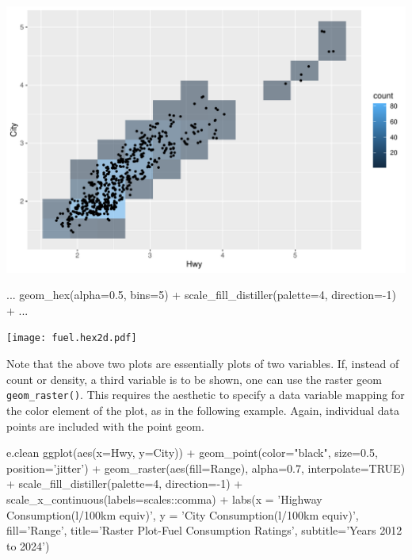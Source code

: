 \begin{center}
  \includegraphics[width=.8\textwidth]{fuel.bin2d.pdf}
\end{center}

\begin{samepage}
\begin{Rcode}
...
    geom_hex(alpha=0.5, bins=5) + 
    scale_fill_distiller(palette=4, direction=-1) +
...
\end{Rcode}
\end{samepage}

\begin{center}
  \texttt{[image: fuel.hex2d.pdf]}
\end{center}

Note that the above two plots are essentially plots of two variables. If, instead of count or density, a third variable is to be shown, one can use the raster geom \texttt{geom\_raster()}. This requires the aesthetic to specify a data variable mapping for the color element of the plot, as in the following example. Again, individual data points are included with the point geom.

\begin{samepage}
\begin{Rcode}
e.clean %
  ggplot(aes(x=Hwy, y=City)) + 
    geom_point(color="black", size=0.5, 
               position='jitter') +
    geom_raster(aes(fill=Range), alpha=0.7, 
                interpolate=TRUE) + 
    scale_fill_distiller(palette=4, direction=-1) +
    scale_x_continuous(labels=scales::comma) +
    labs(x = 'Highway Consumption\n(l/100km equiv)', 
         y = 'City Consumption\n(l/100km equiv)', 
         fill='Range', 
         title='Raster Plot-Fuel Consumption Ratings', 
         subtitle='Years 2012 to 2024') 
\end{Rcode}
\end{samepage}

